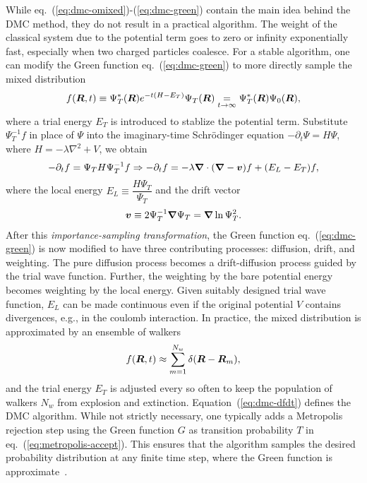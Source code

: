 While eq.~(\ref{eq:dmc-omixed})-(\ref{eq:dmc-green}) contain the main idea behind the DMC method, they do not result in a practical algorithm. The weight of the classical system due to the potential term goes to zero or infinity exponentially fast, especially when two charged particles coalesce. For a stable algorithm, one can modify the Green function eq.~(\ref{eq:dmc-green}) to more directly sample the mixed distribution
\begin{align}
f(\boldsymbol{R},t) \equiv \Psi_T^*(\boldsymbol{R}) e^{-t(H-E_T)}\Psi_T(\boldsymbol{R}) \underset{t\rightarrow\infty}{=} \Psi_T^*(\boldsymbol{R})\Psi_0(\boldsymbol{R}),
\end{align}
where a trial energy $E_T$ is introduced to stablize the potential term.
Substitute $\Psi_T^{-1}f$ in place of $\Psi$ into the imaginary-time Schr\"odinger equation $-\partial_t \Psi = H\Psi$, where $H=-\lambda\nabla^2+V$, we obtain
\begin{align} \label{eq:dmc-dfdt}
-\partial_t f = \Psi_T H \Psi_T^{-1} f \Rightarrow -\partial_t f=-\lambda\boldsymbol{\nabla}\cdot(\boldsymbol{\nabla}-\boldsymbol{v})f+(E_L-E_T)f,
\end{align}
where the local energy $E_L\equiv \dfrac{H\Psi_T}{\Psi_T}$ and the drift vector
\begin{align} \label{eq:dmc-drift}
\boldsymbol{v}\equiv2\Psi_T^{-1}\boldsymbol{\nabla}\Psi_T=\boldsymbol{\nabla}\ln\Psi_T^2.
\end{align}
After this \emph{importance-sampling transformation}, the Green function eq.~(\ref{eq:dmc-green}) is now modified to have three contributing processes: diffusion, drift, and weighting. The pure diffusion process becomes a drift-diffusion process guided by the trial wave function. Further, the weighting by the bare potential energy becomes weighting by the local energy. Given suitably designed trial wave function, $E_L$ can be made continuous even if the original potential $V$ contains divergences, e.g., in the coulomb interaction.
In practice, the mixed distribution is approximated by an ensemble of walkers
\begin{align}
f(\boldsymbol{R},t) \approx \sum\limits_{m=1}^{N_w} \delta(\boldsymbol{R}-\boldsymbol{R}_m),
\end{align}
and the trial energy $E_T$ is adjusted every so often to keep the population of walkers $N_w$ from explosion and extinction. Equation~(\ref{eq:dmc-dfdt}) defines the DMC algorithm.
While not strictly necessary, one typically adds a Metropolis rejection step using the Green function $G$ as transition probability $T$ in eq.~(\ref{eq:metropolis-accept}). This ensures that the algorithm samples the desired probability distribution at any finite time step, where the Green function is approximate~\cite{Reynolds1982}.

